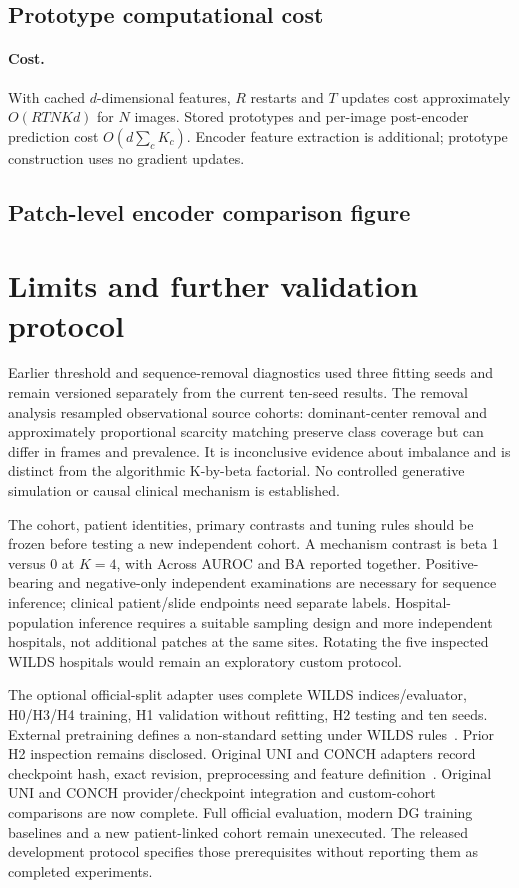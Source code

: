 \documentclass[10pt,letterpaper]{article}
\begin{document}
\subsection{Prototype computational cost}
\paragraph{Cost.}
With cached $d$-dimensional features, $R$ restarts and $T$ updates cost approximately $O(RTNKd)$ for $N$ images. Stored prototypes and per-image post-encoder prediction cost $O(d\sum_cK_c)$. Encoder feature extraction is additional; prototype construction uses no gradient updates.

\subsection{Patch-level encoder comparison figure}


\section{Limits and further validation protocol}
Earlier threshold and sequence-removal diagnostics used three fitting seeds and remain versioned separately from the current ten-seed results. The removal analysis resampled observational source cohorts: dominant-center removal and approximately proportional scarcity matching preserve class coverage but can differ in frames and prevalence. It is inconclusive evidence about imbalance and is distinct from the algorithmic K-by-beta factorial. No controlled generative simulation or causal clinical mechanism is established.

The cohort, patient identities, primary contrasts and tuning rules should be frozen before testing a new independent cohort. A mechanism contrast is beta 1 versus 0 at $K=4$, with Across AUROC and BA reported together. Positive-bearing and negative-only independent examinations are necessary for sequence inference; clinical patient/slide endpoints need separate labels. Hospital-population inference requires a suitable sampling design and more independent hospitals, not additional patches at the same sites. Rotating the five inspected WILDS hospitals would remain an exploratory custom protocol.

The optional official-split adapter uses complete WILDS indices/evaluator, H0/H3/H4 training, H1 validation without refitting, H2 testing and ten seeds. External pretraining defines a non-standard setting under WILDS rules~\cite{wilds2026submission}. Prior H2 inspection remains disclosed. Original UNI and CONCH adapters record checkpoint hash, exact revision, preprocessing and feature definition~\cite{chen2024uni,lu2024conch}. Original UNI and CONCH provider/checkpoint integration and custom-cohort comparisons are now complete. Full official evaluation, modern DG training baselines and a new patient-linked cohort remain unexecuted. The released development protocol specifies those prerequisites without reporting them as completed experiments.



\end{document}
